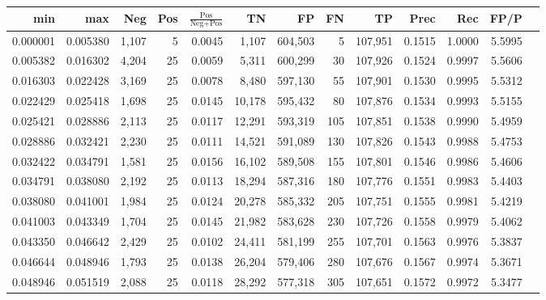 \begin{tabular}{rrrrrrrrrrrrr}
\toprule
     min &      max &   Neg & Pos & $\frac{\text{Pos}}{\text{Neg}+\text{Pos}}$ &      TN &      FP &      FN &      TP &   Prec &    Rec &   FP/P \\
\midrule
0.000001 & 0.005380 & 1,107 &   5 &                                     0.0045 &   1,107 & 604,503 &       5 & 107,951 & 0.1515 & 1.0000 & 5.5995 \\
0.005382 & 0.016302 & 4,204 &  25 &                                     0.0059 &   5,311 & 600,299 &      30 & 107,926 & 0.1524 & 0.9997 & 5.5606 \\
0.016303 & 0.022428 & 3,169 &  25 &                                     0.0078 &   8,480 & 597,130 &      55 & 107,901 & 0.1530 & 0.9995 & 5.5312 \\
0.022429 & 0.025418 & 1,698 &  25 &                                     0.0145 &  10,178 & 595,432 &      80 & 107,876 & 0.1534 & 0.9993 & 5.5155 \\
0.025421 & 0.028886 & 2,113 &  25 &                                     0.0117 &  12,291 & 593,319 &     105 & 107,851 & 0.1538 & 0.9990 & 5.4959 \\
0.028886 & 0.032421 & 2,230 &  25 &                                     0.0111 &  14,521 & 591,089 &     130 & 107,826 & 0.1543 & 0.9988 & 5.4753 \\
0.032422 & 0.034791 & 1,581 &  25 &                                     0.0156 &  16,102 & 589,508 &     155 & 107,801 & 0.1546 & 0.9986 & 5.4606 \\
0.034791 & 0.038080 & 2,192 &  25 &                                     0.0113 &  18,294 & 587,316 &     180 & 107,776 & 0.1551 & 0.9983 & 5.4403 \\
0.038080 & 0.041001 & 1,984 &  25 &                                     0.0124 &  20,278 & 585,332 &     205 & 107,751 & 0.1555 & 0.9981 & 5.4219 \\
0.041003 & 0.043349 & 1,704 &  25 &                                     0.0145 &  21,982 & 583,628 &     230 & 107,726 & 0.1558 & 0.9979 & 5.4062 \\
0.043350 & 0.046642 & 2,429 &  25 &                                     0.0102 &  24,411 & 581,199 &     255 & 107,701 & 0.1563 & 0.9976 & 5.3837 \\
0.046644 & 0.048946 & 1,793 &  25 &                                     0.0138 &  26,204 & 579,406 &     280 & 107,676 & 0.1567 & 0.9974 & 5.3671 \\
0.048946 & 0.051519 & 2,088 &  25 &                                     0.0118 &  28,292 & 577,318 &     305 & 107,651 & 0.1572 & 0.9972 & 5.3477 \\

\end{tabular}
